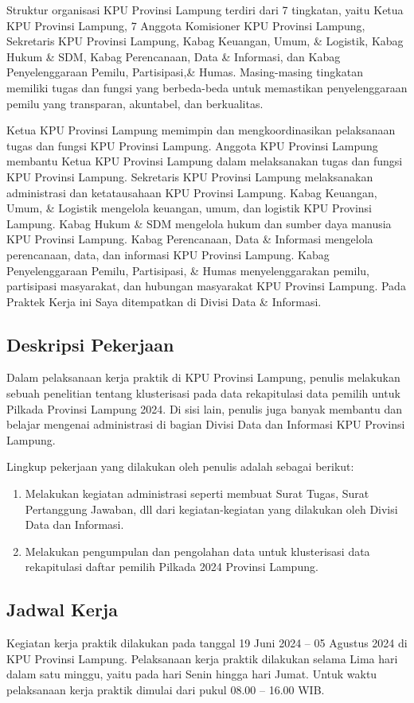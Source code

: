 Struktur organisasi KPU Provinsi Lampung terdiri dari 7 tingkatan, yaitu Ketua KPU Provinsi Lampung, 7 Anggota Komisioner KPU Provinsi Lampung, Sekretaris KPU Provinsi Lampung, Kabag Keuangan, Umum, \& Logistik, Kabag Hukum \& SDM, Kabag Perencanaan, Data \& Informasi, dan Kabag Penyelenggaraan Pemilu, Partisipasi,\& Humas. Masing-masing tingkatan memiliki tugas dan fungsi yang berbeda-beda untuk memastikan penyelenggaraan pemilu yang transparan, akuntabel, dan berkualitas.

Ketua KPU Provinsi Lampung memimpin dan mengkoordinasikan pelaksanaan tugas dan fungsi KPU Provinsi Lampung. Anggota KPU Provinsi Lampung membantu Ketua KPU Provinsi Lampung dalam melaksanakan tugas dan fungsi KPU Provinsi Lampung. Sekretaris KPU Provinsi Lampung melaksanakan administrasi dan ketatausahaan KPU Provinsi Lampung. Kabag Keuangan, Umum, \& Logistik mengelola keuangan, umum, dan logistik KPU Provinsi Lampung. Kabag Hukum \& SDM mengelola hukum dan sumber daya manusia KPU Provinsi Lampung. Kabag Perencanaan, Data \& Informasi mengelola perencanaan, data, dan informasi KPU Provinsi Lampung. Kabag Penyelenggaraan Pemilu, Partisipasi, \& Humas menyelenggarakan pemilu, partisipasi masyarakat, dan hubungan masyarakat KPU Provinsi Lampung. Pada Praktek Kerja ini Saya ditempatkan di Divisi Data \& Informasi.

\subsection{Deskripsi Pekerjaan}
Dalam pelaksanaan kerja praktik di KPU Provinsi Lampung, penulis melakukan sebuah penelitian tentang klusterisasi pada data rekapitulasi data pemilih untuk Pilkada Provinsi Lampung 2024. Di sisi lain, penulis juga banyak membantu dan belajar mengenai administrasi di bagian Divisi Data dan Informasi KPU Provinsi Lampung.

Lingkup pekerjaan yang dilakukan oleh penulis adalah sebagai berikut:
\begin{enumerate}
    \item Melakukan kegiatan administrasi seperti membuat Surat Tugas, Surat Pertanggung Jawaban, dll dari kegiatan-kegiatan yang dilakukan oleh Divisi Data dan Informasi.
    \item Melakukan pengumpulan dan pengolahan data untuk klusterisasi data rekapitulasi daftar pemilih Pilkada 2024 Provinsi Lampung.
\end{enumerate}

\subsection{Jadwal Kerja}
Kegiatan kerja praktik dilakukan pada tanggal 19 Juni 2024 – 05 Agustus 2024 di KPU Provinsi Lampung. Pelaksanaan kerja praktik dilakukan selama Lima hari dalam satu minggu, yaitu pada hari Senin hingga hari Jumat. Untuk waktu pelaksanaan kerja praktik dimulai dari pukul 08.00 – 16.00 WIB. 

\newpage